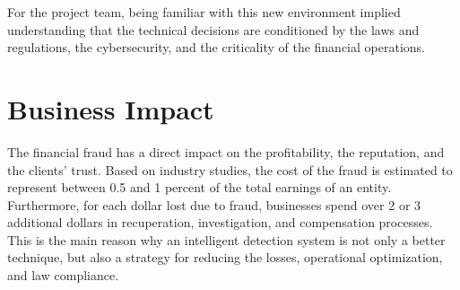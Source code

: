 \documentclass[12pt]{report} %
\begin{document}
For the project team, being familiar with this new environment implied understanding that the technical decisions are conditioned by the laws and regulations, the cybersecurity, and the criticality of the financial operations.

\section{Business Impact}
The financial fraud has a direct impact on the profitability, the reputation, and the clients' trust. Based on industry studies, the cost of the fraud is estimated to represent between 0.5 and 1 percent of the total earnings of an entity. Furthermore, for each dollar lost due to fraud, businesses spend over 2 or 3 additional dollars in recuperation, investigation, and compensation processes.
This is the main reason why an intelligent detection system is not only a better technique, but also a strategy for reducing the losses, operational optimization, and law compliance.
\end{document}
